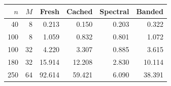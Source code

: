 \begin{tabular}{rrrrrr}
\toprule
$n$ & $M$ & Fresh & Cached & Spectral & Banded \\
\midrule
40 & 8 & 0.213 & 0.150 & 0.203 & 0.322 \\
100 & 8 & 1.059 & 0.832 & 0.801 & 1.072 \\
100 & 32 & 4.220 & 3.307 & 0.885 & 3.615 \\
180 & 32 & 15.914 & 12.208 & 2.830 & 10.114 \\
250 & 64 & 92.614 & 59.421 & 6.090 & 38.391 \\
\bottomrule
\end{tabular}
